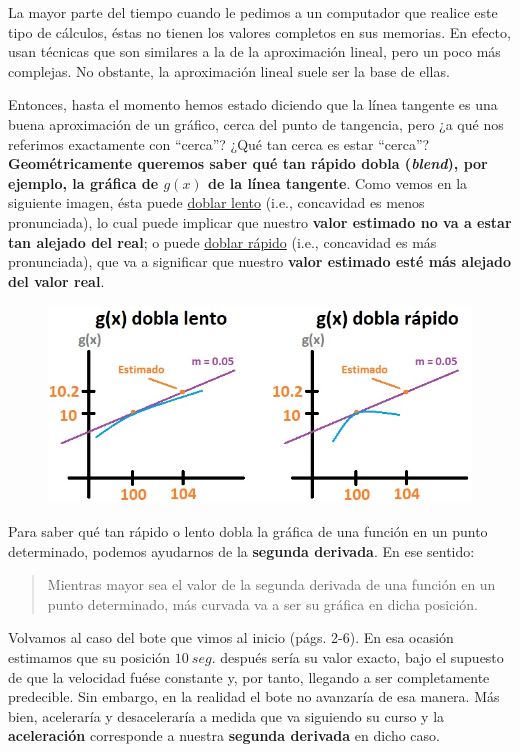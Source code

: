 \documentclass[12pt]{article}
\begin{document}
La mayor parte del tiempo cuando le pedimos a un computador que realice este tipo de cálculos, éstas no tienen los valores completos en sus memorias. En efecto, usan técnicas que son similares a la de la aproximación lineal, pero un poco más complejas. No obstante, la aproximación lineal suele ser la base de ellas.

Entonces, hasta el momento hemos estado diciendo que la línea tangente es una buena aproximación de un gráfico, cerca del punto de tangencia, pero ¿a qué nos referimos exactamente con ``cerca''? ¿Qué tan cerca es estar ``cerca''? \textbf{Geométricamente queremos saber qué tan rápido dobla (\textit{blend}), por ejemplo, la gráfica de $g(x)$ de la línea tangente}. Como vemos en la siguiente imagen, ésta puede \underline{doblar lento} (i.e., concavidad es menos pronunciada), lo cual puede implicar que nuestro \textbf{valor estimado no va a estar tan alejado del real}; o puede \underline{doblar rápido} (i.e., concavidad es más pronunciada), que va a significar que nuestro \textbf{valor estimado esté más alejado del valor real}.

\newpage

\begin{figure}[hbt!]
\centering
\includegraphics[scale=0.7]{img/approx_lin_blend_lvl.jpg}
\end{figure}

Para saber qué tan rápido o lento dobla la gráfica de una función en un punto determinado, podemos ayudarnos de la \textbf{segunda derivada}. En ese sentido:

\begin{quote}
\centering
Mientras mayor sea el valor de la segunda derivada de una función en un punto determinado, más curvada va a ser su gráfica en dicha posición.
\end{quote}

Volvamos al caso del bote que vimos al inicio (págs. 2-6). En esa ocasión estimamos que su posición $10 \ seg.$ después sería su valor exacto, bajo el supuesto de que la velocidad fuése constante y, por tanto, llegando a ser completamente predecible. Sin embargo, en la realidad el bote no avanzaría de esa manera. Más bien, aceleraría y desaceleraría a medida que va siguiendo su curso y la \textbf{aceleración} corresponde a nuestra \textbf{segunda derivada} en dicho caso.
\end{document}
